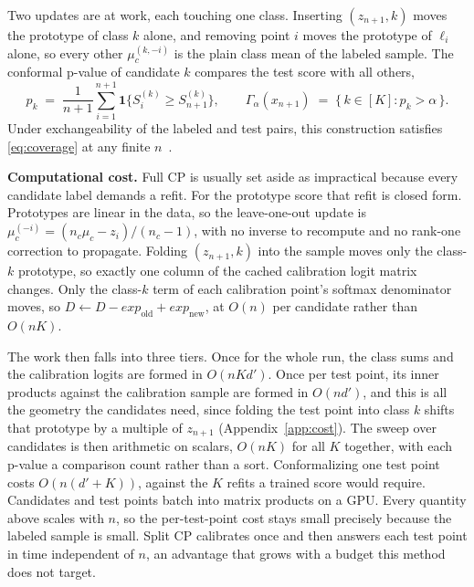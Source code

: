 Two updates are at work, each touching one class. Inserting
$(z_{n+1}, k)$ moves the prototype of class $k$ alone, and removing
point $i$ moves the prototype of $\ell_i$ alone, so every other
$\mu^{(k,-i)}_{c}$ is the plain class mean of the labeled sample.
The conformal p-value of candidate $k$ compares the test score with
all others,
\begin{equation}
\label{eq:pvalue}
p_k \;=\; \frac{1}{n+1} \sum_{i=1}^{n+1}
\mathbf{1}\bigl\{ S^{(k)}_{i} \ge S^{(k)}_{n+1} \bigr\} ,
\qquad
\Gamma_\alpha(x_{n+1}) \;=\; \bigl\{\, k \in [K] : p_k > \alpha \,\bigr\} .
\end{equation}
Under exchangeability of the labeled and test pairs, this construction
satisfies \eqref{eq:coverage} at any finite $n$~\citep{vovk2005algorithmic}.

\textbf{Computational cost.} Full CP is usually set aside as
impractical because every candidate label demands a refit. For the
prototype score that refit is closed form. Prototypes are linear in
the data, so the leave-one-out update is
$\mu^{(-i)}_{c} = (n_c \mu_c - z_i)/(n_c - 1)$, with no inverse to
recompute and no rank-one correction to propagate. Folding
$(z_{n+1}, k)$ into the sample moves only the class-$k$ prototype, so
exactly one column of the cached calibration logit matrix changes.
Only the class-$k$ term of each calibration point's softmax denominator
moves, so $D \leftarrow D - exp_{\mathrm{old}} + exp_{\mathrm{new}}$, at $O(n)$
per candidate rather than $O(nK)$.

The work then falls into three tiers. Once for the whole run, the class
sums and the calibration logits are formed in $O(nKd')$. Once per test
point, its inner products against the calibration sample are formed in
$O(nd')$, and this is all the geometry the candidates need, since
folding the test point into class $k$ shifts that prototype by a
multiple of $z_{n+1}$ (Appendix~\ref{app:cost}). The sweep over candidates is then arithmetic on
scalars, $O(nK)$ for all $K$ together, with each p-value a comparison
count rather than a sort. Conformalizing one test point costs
$O(n(d' + K))$, against the $K$ refits a trained score would require.
Candidates and test points batch into matrix products on a GPU.
Every quantity above scales with $n$, so the per-test-point cost stays
small precisely because the labeled sample is small. Split CP
calibrates once and then answers each test point in time independent of
$n$, an advantage that grows with a budget this method does not target.

